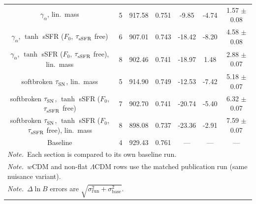 \begin{longtable}{c c c c c c c}
    $\gamma_\alpha^{}$, lin.\ mass & 5 & 917.58 & 0.751 & \cellcolor{aiclightgreen}-9.85 & \cellcolor{aicyellow}-4.74 & \cellcolor{aicyellow}1.57 $\pm$ 0.08 \\
    $\gamma_\alpha^{}$, $\tanh$ sSFR ($F_0$, $\tau_{\rm sSFR}^{}$ free) & 6 & 907.01 & 0.743 & \cellcolor{aicgreen}-18.42 & \cellcolor{aiclightgreen}-8.20 & \cellcolor{aiclightgreen}4.58 $\pm$ 0.08 \\
    $\gamma_\alpha^{}$, $\tanh$ sSFR ($F_0$, $\tau_{\rm sSFR}^{}$ free), lin.\ mass & 8 & 902.46 & 0.741 & \cellcolor{aicgreen}-18.97 & 1.48 & \cellcolor{aicyellow}2.88 $\pm$ 0.07 \\
    softbroken $\tau_{\rm SN}^{}$, lin.\ mass & 5 & 914.90 & 0.749 & \cellcolor{aicgreen}-12.53 & \cellcolor{aiclightgreen}-7.42 & \cellcolor{aicgreen}5.18 $\pm$ 0.07 \\
    softbroken $\tau_{\rm SN}^{}$, $\tanh$ sSFR ($F_0$, $\tau_{\rm sSFR}^{}$ free) & 7 & 902.70 & 0.741 & \cellcolor{aicgreen}-20.74 & \cellcolor{aicyellow}-5.40 & \cellcolor{aicgreen}6.32 $\pm$ 0.07 \\
    softbroken $\tau_{\rm SN}^{}$, $\tanh$ sSFR ($F_0$, $\tau_{\rm sSFR}^{}$ free), lin.\ mass & 8 & 898.08 & 0.737 & \cellcolor{aicgreen}-23.36 & \cellcolor{aiclightyellow}-2.91 & \cellcolor{aicgreen}7.59 $\pm$ 0.07 \\
    Baseline & 4 & 929.43 & 0.761 & --- & --- & --- \\
    \multicolumn{7}{l}{\textit{Note.}~Each section is compared to its own baseline run.} \\
    \multicolumn{7}{l}{\textit{Note.}~$w$CDM and non-flat $\Lambda$CDM rows use the matched publication run (same nuisance variant).} \\
    \multicolumn{7}{l}{\textit{Note.}~$\Delta\ln B$ errors are $\sqrt{\sigma_\mathrm{run}^2 + \sigma_\mathrm{base}^2}$.}
\end{longtable}
\twocolumngrid
